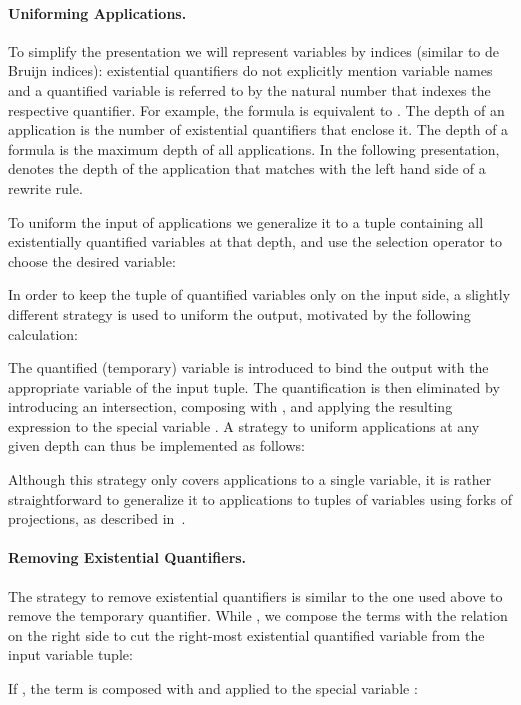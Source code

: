 \documentclass{llncs}
\begin{document}
\paragraph{Uniforming Applications.} To simplify the presentation we
will represent variables by indices (similar to de Bruijn indices):
existential quantifiers do not explicitly mention variable names and a
quantified variable is referred to by the natural number that indexes the
respective quantifier. For example, the formula  is equivalent to
. The depth of an application is the number of existential
quantifiers that enclose it. The depth of a formula is the maximum
depth of all applications. In the following presentation,  denotes
the depth of the application that matches with the left hand side of
a rewrite rule.

To uniform the input of applications we generalize it to a tuple
containing all existentially quantified variables at that depth, and
use the selection operator to choose the desired variable:


In order to keep the tuple of quantified variables only on the input
side, a slightly different strategy is used to uniform the output,
motivated by the following calculation:

The quantified (temporary) variable  is introduced to bind the
output with the appropriate variable of the input tuple. The
quantification is then eliminated by introducing an intersection,
composing with , and applying the resulting expression to the
special variable . A strategy to uniform applications at
any given depth can thus be implemented as follows:

Although this strategy only covers applications to a single variable,
it is rather straightforward to generalize it to applications to tuples of
variables using forks of projections, as described in~\cite{allpf}. 

\paragraph{Removing Existential Quantifiers.} The strategy to remove
existential quantifiers is similar to the one used above to remove the
temporary quantifier. While , we compose the terms with the
relation  on the right side to cut the
right-most existential quantified variable from the input variable tuple:

If , the term is composed with  and applied to the special variable :
\end{document}
